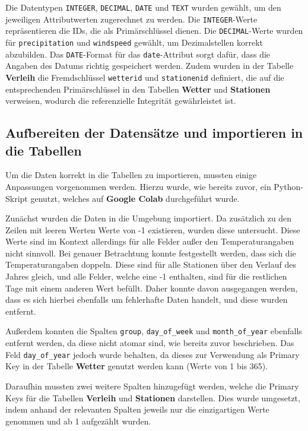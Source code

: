 \documentclass{article}
\begin{document}
Die Datentypen \texttt{INTEGER}, \texttt{DECIMAL}, \texttt{DATE} und \texttt{TEXT} wurden gewählt, um den jeweiligen Attributwerten zugerechnet zu werden. Die \texttt{INTEGER}-Werte repräsentieren die IDs, die als Primärschlüssel dienen. Die \texttt{DECIMAL}-Werte wurden für \texttt{precipitation} und \texttt{windspeed} gewählt, um Dezimalstellen korrekt abzubilden. Das \texttt{DATE}-Format für das \texttt{date}-Attribut sorgt dafür, dass die Angaben des Datums richtig gespeichert werden. Zudem wurden in der Tabelle \textbf{Verleih} die Fremdschlüssel \texttt{wetterid} und \texttt{stationenid} definiert, die auf die entsprechenden Primärschlüssel in den Tabellen \textbf{Wetter} und \textbf{Stationen} verweisen, wodurch die referenzielle Integrität gewährleistet ist.

\subsection{Aufbereiten der Datensätze und importieren in die Tabellen}

Um die Daten korrekt in die Tabellen zu importieren, mussten einige Anpassungen vorgenommen werden. Hierzu wurde, wie bereits zuvor, ein Python-Skript genutzt, welches auf \textbf{Google Colab} durchgeführt wurde. 

Zunächst wurden die Daten in die Umgebung importiert. Da zusätzlich zu den Zeilen mit leeren Werten Werte von -1 existieren, wurden diese untersucht. Diese Werte sind im Kontext allerdings für alle Felder außer den Temperaturangaben nicht sinnvoll. Bei genauer Betrachtung konnte festgestellt werden, dass sich die Temperaturangaben doppeln. Diese sind für alle Stationen über den Verlauf des Jahres gleich, und alle Felder, welche eine -1 enthalten, sind für die restlichen Tage mit einem anderen Wert befüllt. Daher konnte davon ausgegangen werden, dass es sich hierbei ebenfalls um fehlerhafte Daten handelt, und diese wurden entfernt. 

Außerdem konnten die Spalten \texttt{group}, \texttt{day\_of\_week} und \texttt{month\_of\_year} ebenfalls entfernt werden, da diese nicht atomar sind, wie bereits zuvor beschrieben. Das Feld \texttt{day\_of\_year} jedoch wurde behalten, da dieses zur Verwendung als Primary Key in der Tabelle \textbf{Wetter} genutzt werden kann (Werte von 1 bis 365). 

Daraufhin mussten zwei weitere Spalten hinzugefügt werden, welche die Primary Keys für die Tabellen \textbf{Verleih} und \textbf{Stationen} darstellen. Dies wurde umgesetzt, indem anhand der relevanten Spalten jeweils nur die einzigartigen Werte genommen und ab 1 aufgezählt wurden. 
\end{document}
